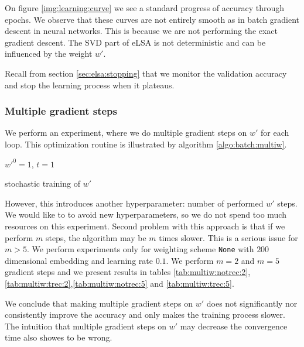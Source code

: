     On figure \ref{img:learning:curve} we see a standard progress of accuracy through epochs. 
    We observe that these curves are not entirely smooth as in batch gradient descent in neural networks.
    This is because we are not performing the exact gradient descent.
    The SVD part of eLSA is not deterministic and can be influenced by the weight $w'$.
    
    Recall from section \ref{sec:elsa:stopping} that we monitor the validation accuracy and stop the learning process when it plateaus. 

    \subsubsection{Multiple gradient steps}
    
    We perform an experiment, where we do multiple gradient steps on $w'$ for each loop. 
    This optimization routine is illustrated by algorithm \ref{algo:batch:multiw}.
    
    \begin{algorithm}[H]
        $w'^0 = 1$, $t=1$\;
        \caption{stochastic training of $w'$} \label{algo:batch:multiw}
    \end{algorithm}
    
    However, this introduces another hyperparameter: number of performed $w'$ steps.
    We would like to to avoid new hyperparameters, so we do not spend too much resources on this experiment.
    Second problem with this approach is that if we perform $m$ steps, the algorithm may be $m$ times slower. 
    This is a serious issue for $m>5$. 
    We perform experiments only for weighting scheme \texttt{None} with $200$ dimensional embedding and learning rate $0.1$.
    We perform $m=2$ and $m=5$ gradient steps and we present results in tables \ref{tab:multiw:notrec:2},
    \ref{tab:multiw:trec:2},\ref{tab:multiw:notrec:5} and \ref{tab:multiw:trec:5}.
    
    

    We conclude that making multiple gradient steps on $w'$ does not significantly nor consistently improve the accuracy and only makes the training process slower.
    The intuition that multiple gradient steps on $w'$ may decrease the convergence time also showes to be wrong.


